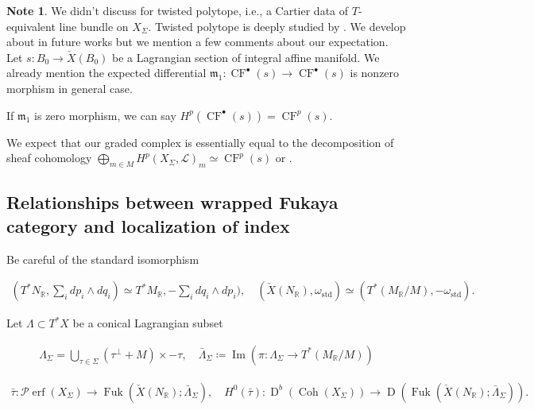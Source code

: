 \documentclass[a4paper,dvipdfmx,reqno,12pt]{amsart}
\theoremstyle{definition}
\newtheorem{Note}[Thm]{Note}
\newcommand{\deq}{\coloneqq}
\newcommand{\R}{\mathbb{R}}%
\newcommand{\mcal}[1]{\mathcal{#1}}%
\newcommand{\mf}[1]{\mathfrak{#1}}%
\newcommand{\opn}[1]{\operatorname{#1}}
\numberwithin{equation}{section}
\begin{document}
\begin{Note}
  We didn't discuss for twisted polytope, i.e., a Cartier data of $T$-equivalent line bundle on $X_{\Sigma}$.
  Twisted polytope is deeply studied by \cite{MR1243782}.
  We develop about in future works but we mention a few comments about our expectation.
  Let $s:B_0 \to \check{X}(B_0)$ be a Lagrangian section of integral affine manifold.
  We already mention the expected differential $\mf{m}_1: \opn{CF}^{\bullet}(s)\to \opn{CF}^{\bullet}(s)$ is nonzero morphism in general case.

  If $\mf{m}_1$ is zero morphism, we can say $H^{p}(\opn{CF}^{\bullet}(s))=\opn{CF}^{p}(s)$.

  We expect that our graded complex is essentially
  equal to the decomposition of sheaf cohomology
  $\bigoplus_{m\in M}H^{p}(X_{\Sigma},\mcal{L})_m\simeq \opn{CF}^{p}(s)$ \cite[Theorem 9.1.3]{coxToricVarieties2011a}
  or \cite{MR1243782}.


\end{Note}



\subsection{Relationships between wrapped Fukaya category and localization of index}

Be careful of the standard isomorphism

\begin{align}
  (T^*N_{\R},\sum _idp_i\wedge dq_i)
  \simeq T^{*}M_{\R},-\sum_i dq_i\wedge dp_i),
  \quad (\check{X}(N_{\R}),\omega_{\opn{std}})\simeq (T^{*}(M_{\R}/M),-\omega_{\opn{std}}).
\end{align}

Let $\Lambda \subset T^{*}X$ be a conical Lagrangian subset

\begin{align}
  \Lambda_{\Sigma} =
  \bigcup_{\tau \in \Sigma}(\tau^{\bot} +M)\times -\tau,
  \quad \bar{\Lambda}_{\Sigma}\deq \opn{Im}(\pi:\Lambda_{\Sigma} \to T^{*}(M_{\R}/M))
\end{align}

\cite[Theorem 2, Corollary 2]{MR2871160}

\begin{align}
  \bar{\tau}:\mcal{P}\!\opn{erf}(X_{\Sigma})
  \to \opn{Fuk}(\check{X}(N_{\R});\bar{\Lambda}_{\Sigma}), \quad
  H^{0}(\bar{\tau}): \opn{D}^{b}(\opn{Coh}(X_{\Sigma}))\to
  \opn{D}(\opn{Fuk}(\check{X}(N_{\R});\bar{\Lambda}_{\Sigma})).
\end{align}
\end{document}
